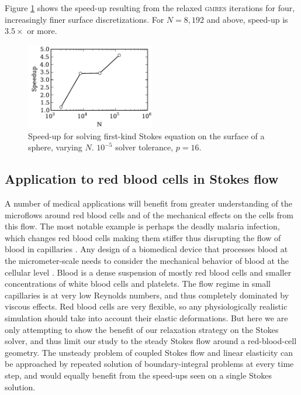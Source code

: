 \documentclass[final,leqno,]{siamltex1213}
\newcommand{\gmres}{\textsc{gmres}\xspace}
\begin{document}
Figure \ref{fig:stokes_speedup} shows the speed-up resulting from the relaxed \gmres iterations for four, increasingly finer surface discretizations. For $N=8,192$ and above, speed-up is $3.5\times$ or more.


\begin{figure}[ht]
\begin{center}
	\includegraphics[natwidth=3in,natheight=2in,width=0.5\textwidth]{StokesSpeedupRelaxation.pdf}
	\caption{Speed-up for solving first-kind Stokes equation on the surface of a sphere, varying $N$. $10^{-5}$ solver tolerance, $p=16$. }
	\label{fig:stokes_speedup}
\end{center}
\end{figure}

\subsection{Application to red blood cells in Stokes flow}

A number of medical applications will benefit from greater understanding of the microflows around red blood cells and of the mechanical effects on the cells from this flow. 
The most notable example is perhaps the deadly malaria infection, which changes red blood cells making them stiffer thus disrupting the flow of blood in capillaries \cite{FedosovETal2011}.
Any design of a biomedical device that processes blood at the micrometer-scale needs to consider the mechanical behavior of blood at the cellular level \cite{Freund2014}. Blood is a dense suspension of mostly red blood cells and smaller concentrations of white blood cells and platelets. The flow regime in small capillaries is at very low Reynolds numbers, and thus completely dominated by viscous effects. 
Red blood cells are very flexible, so any physiologically realistic simulation should take into account their elastic deformations. But here we are only attempting to show the benefit of our relaxation strategy on the Stokes solver, and thus limit our study to the steady Stokes flow around a red-blood-cell geometry. The unsteady problem of coupled Stokes flow and linear elasticity can be approached by repeated solution of boundary-integral problems at every time step, and would equally benefit from the speed-ups seen on a single Stokes solution.
\end{document}
